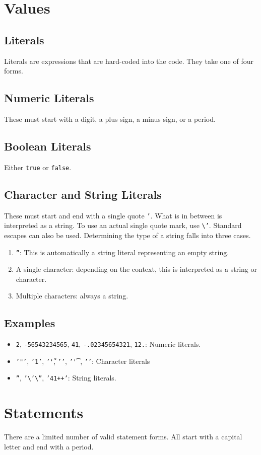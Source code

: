\documentclass{article}
\newcommand{\code}[1]{\texttt{#1}}
\begin{document}
\section{Values}
\subsection{Literals}
Literals are expressions that are hard-coded into the code. They take one of four forms.
\subsection{Numeric Literals}
These must start with a digit, a plus sign, a minus sign, or a period.
\subsection{Boolean Literals}
Either \code{true} or \code{false}.
\subsection{Character and String Literals}
These must start and end with a single quote \code{'}. What is in between is interpreted as a string. To use an actual single quote mark, use \code{\textbackslash'}. Standard escapes can also be used. Determining the type of a string falls into three cases.
\begin{enumerate}
\item \code{''}: This is automatically a string literal representing an empty string.
\item A single character: depending on the context, this is interpreted as a string or character.
\item Multiple characters: always a string.
\end{enumerate}
\subsection{Examples}
\begin{itemize}
\item \code{2}, \code{-56543234565}, \code{41}, \code{-.02345654321}, \code{12.}: Numeric literals.
\item \code{'"'}, \code{'1'}, \code{'\r'}, \code{'\n'}, \code{'\t'}, \code{''}: Character literals
\item \code{''}, \code{'\textbackslash'\textbackslash''}, \code{'41++'}: String literals.
\end{itemize}
\section{Statements}
There are a limited number of valid statement forms. All start with a capital letter and end with a period.
\end{document}
